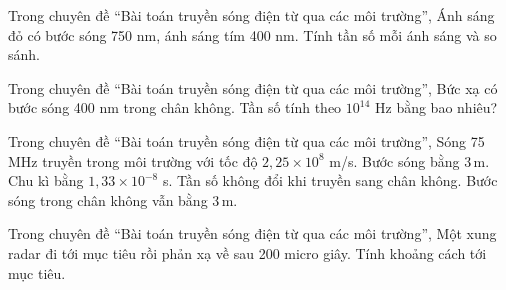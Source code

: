 \begin{ex}
Trong chuyên đề “Bài toán truyền sóng điện từ qua các môi trường”, Ánh sáng đỏ có bước sóng 750 nm, ánh sáng tím 400 nm. Tính tần số mỗi ánh sáng và so sánh.
\choiceTF

\end{ex}

\begin{ex}
Trong chuyên đề “Bài toán truyền sóng điện từ qua các môi trường”, Bức xạ có bước sóng 400 nm trong chân không. Tần số tính theo $10^{14}$ Hz bằng bao nhiêu?
\end{ex}

\begin{ex}
Trong chuyên đề “Bài toán truyền sóng điện từ qua các môi trường”, Sóng 75 MHz truyền trong môi trường với tốc độ $2,25\times10^8$ m/s.
\choiceTF
{\True Bước sóng bằng $3\,\text{m}$.}
{\True Chu kì bằng $1,33\times10^{-8}$ s.}
{\True Tần số không đổi khi truyền sang chân không.}
{Bước sóng trong chân không vẫn bằng $3\,\text{m}$.}
\end{ex}

\begin{ex}
Trong chuyên đề “Bài toán truyền sóng điện từ qua các môi trường”, Một xung radar đi tới mục tiêu rồi phản xạ về sau 200 micro giây. Tính khoảng cách tới mục tiêu.
\choiceTF

\end{ex}

